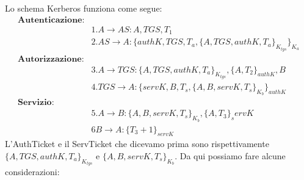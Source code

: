 Lo schema Kerberos funziona come segue:
\begin{align*}
    \textbf{Autenticazione:}\\
    &1. A \rightarrow AS: A, TGS, T_1\\
    &2. AS \rightarrow A: \{authK, TGS, T_a, \{A,TGS, authK,T_a\}_{K_{tgs}}\}_{K_a}\\
    \textbf{Autorizzazione:}\\
    &3. A \rightarrow TGS: \{A,TGS,authK, T_a\}_{K_{tgs}}, \{A, T_2\}_{authK}, B\\
    &4. TGS \rightarrow A: \{servK, B, T_s,\{A,B,servK,T_s\}_{K_b}\}_{authK}\\
    \textbf{Servizio:}\\
    &5. A \rightarrow B: \{A,B, servK,T_s\}_{K_b}, \{A,T_3\}_servK\\
    &6 B \rightarrow A: \{T_3 + 1\}_{servK}
\end{align*}
L'AuthTicket e il ServTicket che dicevamo prima sono rispettivamente $\{A,TGS, authK,T_a\}_{K_{tgs}}$ e $\{A,B, servK,T_s\}_{K_b}$. 
Da qui possiamo fare alcune considerazioni:
